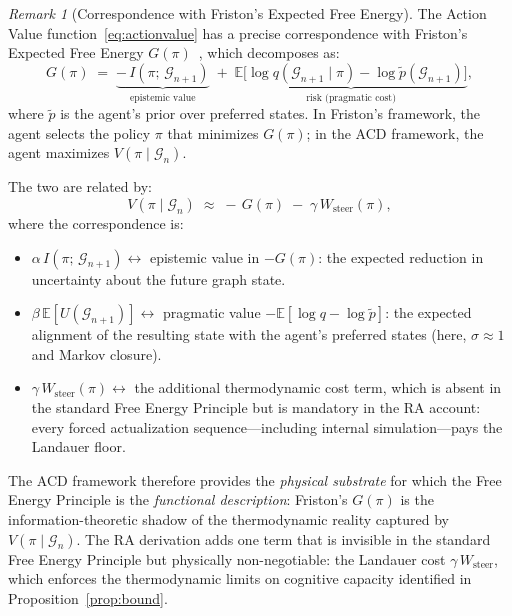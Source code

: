 \documentclass[11pt,a4paper]{article}
\theoremstyle{remark}
\newtheorem{remark}[theorem]{Remark}
\newcommand{\GG}{\mathcal{G}}
\newcommand{\sigmaedge}{\sigma}
\begin{document}
\begin{remark}[Correspondence with Friston's Expected Free Energy]
The Action Value function~\eqref{eq:actionvalue} has a precise correspondence
with Friston's Expected Free Energy $G(\pi)$~\citep{Friston2010,FristonEtAl2017},
which decomposes as:
\begin{equation}
  G(\pi)
  \;=\;
  \underbrace{-\,I(\pi;\,\GG_{n+1})}_{\text{epistemic value}}
  \;+\;
  \underbrace{\mathbb{E}\bigl[\log q(\GG_{n+1}\mid\pi) - \log \tilde{p}(\GG_{n+1})\bigr]}_{\text{risk (pragmatic cost)}},
  \label{eq:friston_G}
\end{equation}
where $\tilde{p}$ is the agent's prior over preferred states. In Friston's
framework, the agent selects the policy $\pi$ that minimizes $G(\pi)$; in the
ACD framework, the agent maximizes $V(\pi \mid \GG_n)$.

The two are related by:
\begin{equation}
  V(\pi \mid \GG_n)
  \;\approx\;
  -\,G(\pi) \;-\; \gamma\,W_{\mathrm{steer}}(\pi),
  \label{eq:V_G_correspondence}
\end{equation}
where the correspondence is:
\begin{itemize}[noitemsep]
  \item $\alpha\,I(\pi;\,\GG_{n+1}) \leftrightarrow$ epistemic value in $-G(\pi)$:
    the expected reduction in uncertainty about the future graph state.
  \item $\beta\,\mathbb{E}[U(\GG_{n+1})] \leftrightarrow$ pragmatic value
    $-\mathbb{E}[\log q - \log\tilde{p}]$: the expected alignment of the resulting
    state with the agent's preferred states (here, $\sigmaedge \approx 1$ and
    Markov closure).
  \item $\gamma\,W_{\mathrm{steer}}(\pi) \leftrightarrow$ the additional
    thermodynamic cost term, which is absent in the standard Free Energy
    Principle but is mandatory in the RA account: every forced actualization
    sequence---including internal simulation---pays the Landauer floor.
\end{itemize}

The ACD framework therefore provides the \emph{physical substrate} for which
the Free Energy Principle is the \emph{functional description}: Friston's
$G(\pi)$ is the information-theoretic shadow of the thermodynamic reality
captured by $V(\pi \mid \GG_n)$. The RA derivation adds one term that is
invisible in the standard Free Energy Principle but physically non-negotiable:
the Landauer cost $\gamma\,W_{\mathrm{steer}}$, which enforces the
thermodynamic limits on cognitive capacity identified in Proposition~\ref{prop:bound}.
\end{remark}
\end{document}
